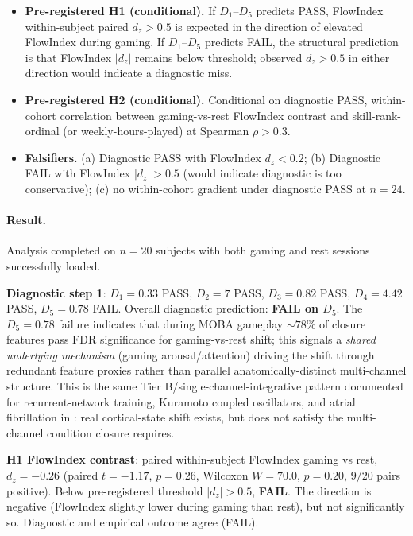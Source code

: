 \documentclass[11pt,a4paper]{article}
\begin{document}
\begin{itemize}\itemsep0pt
\item \textbf{Pre-registered H1 (conditional).} If $D_1$--$D_5$ predicts PASS, FlowIndex within-subject paired $d_z > 0.5$ is expected in the direction of elevated FlowIndex during gaming. If $D_1$--$D_5$ predicts FAIL, the structural prediction is that FlowIndex $|d_z|$ remains below threshold; observed $d_z > 0.5$ in either direction would indicate a diagnostic miss.
\item \textbf{Pre-registered H2 (conditional).} Conditional on diagnostic PASS, within-cohort correlation between gaming-vs-rest FlowIndex contrast and skill-rank-ordinal (or weekly-hours-played) at Spearman $\rho > 0.3$.
\item \textbf{Falsifiers.} (a) Diagnostic PASS with FlowIndex $d_z < 0.2$; (b) Diagnostic FAIL with FlowIndex $|d_z| > 0.5$ (would indicate diagnostic is too conservative); (c) no within-cohort gradient under diagnostic PASS at $n = 24$.
\end{itemize}

\paragraph{Result.} Analysis completed on $n = 20$ subjects with both gaming and rest sessions successfully loaded.

\textbf{Diagnostic step 1}: $D_1 = 0.33$ PASS, $D_2 = 7$ PASS, $D_3 = 0.82$ PASS, $D_4 = 4.42$ PASS, $D_5 = 0.78$ FAIL. Overall diagnostic prediction: \textbf{FAIL on $D_5$}. The $D_5 = 0.78$ failure indicates that during MOBA gameplay $\sim 78\%$ of closure features pass FDR significance for gaming-vs-rest shift; this signals a \emph{shared underlying mechanism} (gaming arousal/attention) driving the shift through redundant feature proxies rather than parallel anatomically-distinct multi-channel structure. This is the same Tier B/single-channel-integrative pattern documented for recurrent-network training, Kuramoto coupled oscillators, and atrial fibrillation in \citep{SmartClosureDistance}: real cortical-state shift exists, but does not satisfy the multi-channel condition closure requires.

\textbf{H1 FlowIndex contrast}: paired within-subject FlowIndex gaming vs rest, $d_z = -0.26$ (paired $t = -1.17$, $p = 0.26$, Wilcoxon $W = 70.0$, $p = 0.20$, $9/20$ pairs positive). Below pre-registered threshold $|d_z| > 0.5$, \textbf{FAIL}. The direction is negative (FlowIndex slightly lower during gaming than rest), but not significantly so. Diagnostic and empirical outcome agree (FAIL).
\end{document}
